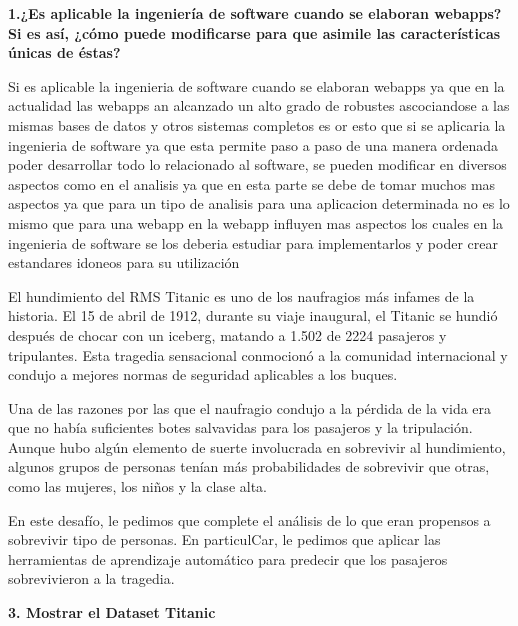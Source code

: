 \documentclass{article}
\begin{document}
{\begin{flushleft}
\begin{itemize}
\textbf{1.¿Es aplicable la ingeniería de software cuando se elaboran webapps? Si es así, ¿cómo puede modificarse para que asimile las características únicas de éstas?}\par
Si es aplicable la ingenieria de software cuando se elaboran webapps ya que en la actualidad las webapps an alcanzado un alto grado de robustes ascociandose a las mismas bases de datos y otros sistemas completos es or esto que si se aplicaria la ingenieria de software ya que esta permite paso a paso de una manera ordenada poder desarrollar todo lo relacionado al software, se pueden modificar en diversos aspectos como en el analisis ya que en esta parte se debe de tomar muchos mas aspectos ya que para un tipo de analisis para una aplicacion determinada no es lo mismo que para una webapp en la webapp influyen mas aspectos los cuales en la ingenieria de software se los deberia estudiar para implementarlos y poder crear estandares idoneos para su utilización 

El hundimiento del RMS Titanic es uno de los naufragios más infames de la historia. El 15 de abril de 1912, durante su viaje inaugural, el Titanic se hundió después de chocar con un iceberg, matando a 1.502 de 2224 pasajeros y tripulantes. Esta tragedia sensacional conmocionó a la comunidad internacional y condujo a mejores normas de seguridad aplicables a los buques.

Una de las razones por las que el naufragio condujo a la pérdida de la vida era que no había suficientes botes salvavidas para los pasajeros y la tripulación. Aunque hubo algún elemento de suerte involucrada en sobrevivir al hundimiento, algunos grupos de personas tenían más probabilidades de sobrevivir que otras, como las mujeres, los niños y la clase alta.

En este desafío, le pedimos que complete el análisis de lo que eran propensos a sobrevivir tipo de personas. En particulCar, le pedimos que aplicar las herramientas de aprendizaje automático para predecir que los pasajeros sobrevivieron a la tragedia.\par
\textbf {3. Mostrar el Dataset Titanic}\par


\end{itemize}
\end{flushleft}}
\end{document}
